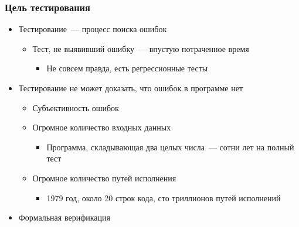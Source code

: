 \documentclass{../../slides-style}
\begin{document}
    \begin{frame}
        \frametitle{Цель тестирования}
        \begin{itemize}
            \item Тестирование~--- процесс поиска ошибок
            \begin{itemize}
                \item Тест, не выявивший ошибку~--- впустую потраченное время
                \begin{itemize}
                    \item Не совсем правда, есть регрессионные тесты
                \end{itemize}
            \end{itemize}
            \item Тестирование не может доказать, что ошибок в программе нет
            \begin{itemize}
                \item Субъективность ошибок
                \item Огромное количество входных данных
                \begin{itemize}
                    \item Программа, складывающая два целых числа~--- сотни лет на полный тест
                \end{itemize}
                \item Огромное количество путей исполнения
                \begin{itemize}
                    \item 1979 год, около 20 строк кода, сто триллионов путей исполнений
                \end{itemize}
            \end{itemize}
            \item Формальная верификация
        \end{itemize}
    \end{frame}
\end{document}
